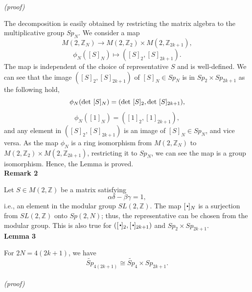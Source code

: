 \documentclass[12pt]{iopart}
\newcommand{\sbt}{\,\begin{picture}(-1,1)(-1,-3)\circle*{2}\end{picture}\ }
\begin{document}
\noindent
{\it (proof)}

The decomposition is easily obtained by restricting the matrix algebra
to the multiplicative group \(Sp_N\).
%
We consider a map
\begin{equation}
M(2,\mathbb Z_N)\rightarrow M(2,\mathbb Z_2)\times M(2,\mathbb Z_{2k+1}),
\end{equation}
\begin{equation}
\phi_N([S]_N)
\mapsto
([S]_2,[S]_{2k+1}).
\end{equation}
%
The map is independent of the choice of representative \(S\) and is well-defined.
%
We can see that the image \(([S]_2,[S]_{2k+1})\) of \([S]_N\in Sp_N\)
is in \(Sp_2\times Sp_{2k+1}\) as the following hold,
\begin{equation}
\phi_N({\rm det}\ [S]_N)
=
({\rm det}\ [S]_2,{\rm det}\ [S]_{2k+1}),
\end{equation}
\begin{equation}
\phi_N([1]_N)
=
([1]_2,[1]_{2k+1}),
\end{equation}
and any element in \(([S]_2,[S]_{2k+1})\)
is an image of \([S]_N\in Sp_N\), and vice versa.
%
As the map \(\phi_N\) is a ring isomorphism from \(M(2,\mathbb Z_N)\)
to \(M(2,\mathbb Z_2)\times M(2,\mathbb Z_{2k+1})\),
restricting it to \(Sp_N\), we can see the map is a group isomorphism.
%
Hence, the Lemma is proved.
\\

\noindent
{\bf Remark 2}
\vspace{2mm}

Let \(S\in M(2,\mathbb Z)\) be a matrix satisfying
\begin{equation}
\alpha\delta-\beta\gamma=1,
\end{equation}
i.e., an element in the modular group \(SL(2,\mathbb Z)\).
%
The map \([\sbt]_N\) is a surjection from \(SL(2,\mathbb Z)\) onto \(Sp(2,N)\);
thus, the representative can be chosen from the modular group.
%
This is also true for \(([\sbt]_2,[\sbt]_{2k+1})\) and \(Sp_2\times Sp_{2k+1}\).
\\

\noindent
{\bf Lemma 3}
\vspace{2mm}

For \(2N=4(2k+1)\), we have
\begin{equation}
\widetilde{Sp}_{4(2k+1)}\cong\widetilde{Sp}_4\times Sp_{2k+1}.
\end{equation}
\ \\

\noindent
{\it (proof)}
\end{document}
